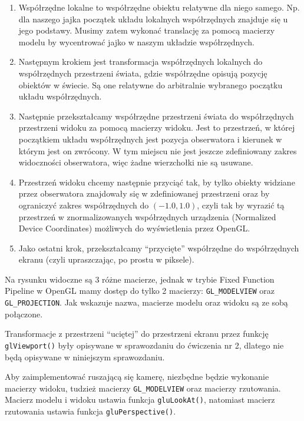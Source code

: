 \documentclass[a4paper]{article}
\begin{document}
\begin{enumerate}
    \item Współrzędne lokalne to współrzędne obiektu relatywne dla niego samego.
          Np. dla naszego jajka początek układu lokalnych współrzędnych znajduje
          się u jego podstawy. Musimy zatem wykonać translację za pomocą
          macierzy modelu by wycentrować jajko w naszym układzie współrzędnych.
    \item Następnym krokiem jest transformacja współrzędnych lokalnych do
          współrzędnych przestrzeni świata, gdzie współrzędne opisują pozycję
          obiektów w świecie. Są one relatywne do arbitralnie wybranego początku
          układu współrzędnych.
    \item Następnie przekształcamy współrzędne przestrzeni świata do
          współrzędnych przestrzeni widoku za pomocą macierzy widoku. Jest to
          przestrzeń, w której początkiem układu współrzędnych jest pozycja
          obserwatora i kierunek w którym jest on zwrócony. W tym miejscu nie
          jest jeszcze zdefiniowany zakres widoczności obserwatora, więc żadne
          wierzchołki nie są usuwane.
    \item Przestrzeń widoku chcemy następnie przyciąć tak, by tylko obiekty
          widziane przez obserwatora znajdowały się w zdefiniowanej przestrzeni
          oraz by ograniczyć zakres współrzędnych do $(-1.0, 1.0)$, czyli tak by
          wyrazić tą przestrzeń w znormalizowanych współrzędnych urządzenia
          (Normalized Device Coordinates) możliwych do wyświetlenia przez
          OpenGL.
    \item Jako ostatni krok, przekształcamy ``przycięte'' współrzędne do
          współrzędnych ekranu (czyli upraszczając, po prostu w piksele).

\end{enumerate}

Na rysunku widoczne są 3 różne macierze, jednak w trybie Fixed Function Pipeline
w OpenGL mamy dostęp do tylko 2 macierzy: \verb|GL_MODELVIEW| oraz
\verb|GL_PROJECTION|. Jak wskazuje nazwa, macierze modelu oraz widoku są ze
sobą połączone.

Transformacje z przestrzeni ``uciętej'' do przestrzeni ekranu przez funkcję
\texttt{glViewport()} były opisywane w sprawozdaniu do ćwiczenia nr 2,
dlatego nie będą opisywane w niniejszym sprawozdaniu.

Aby zaimplementować ruszającą się kamerę, niezbędne będzie wykonanie macierzy
widoku, tudzież macierzy \verb|GL_MODELVIEW| oraz macierzy rzutowania. Macierz
modelu i widoku ustawia funkcja \texttt{gluLookAt()}, natomiast macierz
rzutowania ustawia funkcja \texttt{gluPerspective()}.
\end{document}
